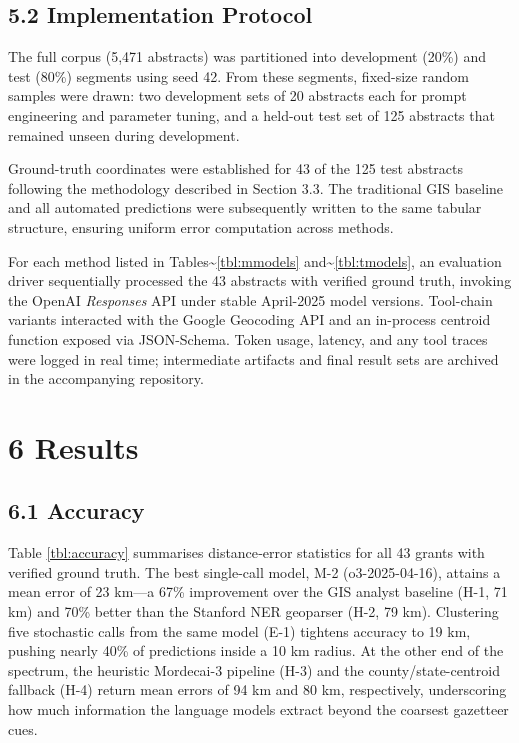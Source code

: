 \documentclass[
  10pt]{article}
\begin{document}
\subsection{5.2 Implementation Protocol}\label{implementation-protocol}

The full corpus (5,471 abstracts) was partitioned into development
(20\%) and test (80\%) segments using seed 42. From these segments,
fixed-size random samples were drawn: two development sets of 20
abstracts each for prompt engineering and parameter tuning, and a
held-out test set of 125 abstracts that remained unseen during
development.

Ground-truth coordinates were established for 43 of the 125 test
abstracts following the methodology described in Section 3.3. The
traditional GIS baseline and all automated predictions were subsequently
written to the same tabular structure, ensuring uniform error
computation across methods.

For each method listed in Tables\textasciitilde{}\ref{tbl:mmodels}
and\textasciitilde{}\ref{tbl:tmodels}, an evaluation driver sequentially
processed the 43 abstracts with verified ground truth, invoking the
OpenAI \emph{Responses} API under stable April-2025 model versions.
Tool-chain variants interacted with the Google Geocoding API and an
in-process centroid function exposed via JSON-Schema. Token usage,
latency, and any tool traces were logged in real time; intermediate
artifacts and final result sets are archived in the accompanying
repository.

\clearpage\onecolumn
\section{6 Results}\label{results}

\subsection{6.1 Accuracy}\label{accuracy}

Table \ref{tbl:accuracy} summarises distance‐error statistics for all 43
grants with verified ground truth. The best single-call model, M-2
(o3-2025-04-16), attains a mean error of 23 km---a 67\% improvement over
the GIS analyst baseline (H-1, 71 km) and 70\% better than the Stanford
NER geoparser (H-2, 79 km). Clustering five stochastic calls from the
same model (E-1) tightens accuracy to 19 km, pushing nearly 40\% of
predictions inside a 10 km radius. At the other end of the spectrum, the
heuristic Mordecai-3 pipeline (H-3) and the county/state-centroid
fallback (H-4) return mean errors of 94 km and 80 km, respectively,
underscoring how much information the language models extract beyond the
coarsest gazetteer cues.
\end{document}
